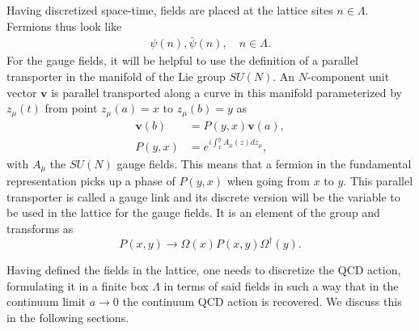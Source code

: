Having discretized space-time, fields are placed at the lattice sites $n\in\Lambda$. Fermions thus look like
\begin{gather}
\psi(n),\bar{\psi}(n), \quad
n\in\Lambda.
\end{gather}
For the gauge fields, it will be helpful to use the definition of a parallel transporter in the manifold of the Lie group $SU(N)$. An $N$-component unit vector $\boldsymbol{v}$ is parallel transported along a curve in this manifold parameterized by $z_{\mu}(t)$ from point $z_{\mu}(a)=x$ to $z_{\mu}(b)=y$ as
\begin{align}
\boldsymbol{v}(b)&=P(y,x)\boldsymbol{v}(a),\\
P(y,x)&=e^{i\int_x^yA_{\mu}(z)dz_{\mu}},
\end{align}
with $A_{\mu}$ the $SU(N)$ gauge fields. This means that a fermion in the fundamental representation picks up a phase of $P(y,x)$ when going from $x$ to $y$. This parallel transporter is called a gauge link and its discrete version will be the variable to be used in the lattice for the gauge fields. It is an element of the group and transforms as
\begin{equation}
P(x,y)\to\Omega(x)P(x,y)\Omega^{\dagger}(y).
\end{equation}

Having defined the fields in the lattice, one needs to discretize the QCD action, formulating it in a finite box $\Lambda$ in terms of said fields in such a way that in the continuum limit $a\rightarrow 0$ the continuum QCD action is recovered. We discuss this in the following sections.	

